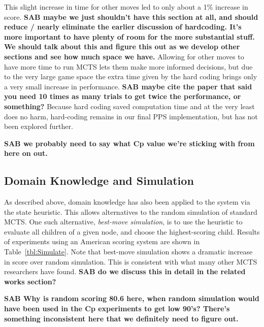 \documentclass[letterpaper]{article}
\begin{document}
This slight increase in time for other moves led to only about a 1\% increase in score. {\bf SAB maybe we just shouldn't have this section at all, and should reduce / nearly eliminate the earlier discussion of hardcoding. It's more important to have plenty of room for the more substantial stuff. We should talk about this and figure this out as we develop other sections and see how much space we have.} Allowing for other moves to have more time to run MCTS lets them make more informed decisions, but due to the very large game space the extra time given by the hard coding brings only a very small increase in performance. {\bf SAB maybe cite the paper that said you need 10 times as many trials to get twice the performance, or something?} Because hard coding saved computation time and at the very least does no harm, hard-coding remains in our final PPS implementation, but has not been explored further.

{\bf SAB we probably need to say what Cp value we're sticking with from here on out.}

\subsection{Domain Knowledge and Simulation}


As described above, domain knowledge has also been applied to the system via the state heuristic. This allows alternatives to the random simulation of standard MCTS. One such alternative, {\it best-move simulation}, is to use the heuristic to evaluate all children of a given node, and choose the highest-scoring child. Results of experiments using an American scoring system are shown in Table~\ref{tbl:Simulate}. Note that best-move simulation shows a dramatic increase in score over random simulation. This is consistent with what many other MCTS researchers have found. {\bf SAB do we discuss this in detail in the related works section?}

{\bf SAB Why is random scoring 80.6 here, when random simulation would have been used in the Cp experiments to get low 90's? There's something inconsistent here that we definitely need to figure out.}
\end{document}
